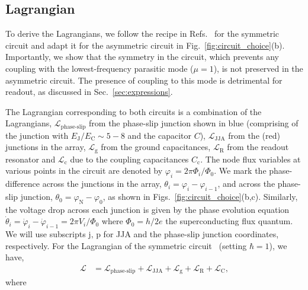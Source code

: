 \documentclass[%
reprint,
superscriptaddress,
 amsmath,amssymb,
 aps,
 prx,
longbibliography,
floatfix,
]{revtex4-2}
\begin{document}
\subsection{Lagrangian}

To derive the Lagrangians, we follow the recipe in Refs.~\cite{viola2015collective,ferguson2013symmetries} for the symmetric circuit and adapt it for the asymmetric circuit in Fig.~\ref{fig:circuit_choice}(b). Importantly, we show that the symmetry in the circuit, which prevents any coupling with the lowest-frequency parasitic mode ($\mu=1$), is not preserved in the asymmetric circuit. The presence of coupling to this mode is detrimental for readout, as discussed in Sec.~\ref{sec:expressions}.

The Lagrangian corresponding to both circuits is a combination of the Lagrangians, $\mathcal{L}_\textrm{phase-slip}$ from the phase-slip junction shown in blue (comprising of the junction with $E_{\textrm{J}}/E_{\textrm{C}}\sim 5-8$ and the capacitor $C$), $\mathcal{L}_\textrm{JJA}$ from the (red) junctions in the array, $\mathcal{L}_\textrm{g}$ from the ground capacitances, $\mathcal{L}_\textrm{R}$ from the readout resonator and $\mathcal{L}_\textrm{c}$ due to the coupling capacitances $C_\textrm{c}$. The node flux variables at various points in the circuit are denoted by $\varphi_i=2\pi\Phi_i/\Phi_0$. We mark the phase-difference across the junctions in the array, $\theta_{i}=\varphi_i-\varphi_{i-1}$, and across the phase-slip junction, $\theta_0=\varphi_\textrm{N}-\varphi_{0}$, as shown in Figs.~\ref{fig:circuit_choice}(b,c). Similarly, the voltage drop across each junction is given by the phase evolution equation $\dot{\theta}_i=\dot{\varphi}_i-\dot{\varphi}_{i-1}=2\pi V_i/\Phi_0$ where $\Phi_0=h/2e$ the superconducting flux quantum. We will use subscripts $\textrm{j, p}$ for JJA and the phase-slip junction coordinates, respectively. For the Lagrangian of the symmetric circuit~\cite{viola2015collective,ferguson2013symmetries} (setting $\hbar=1$), we have, 
\begin{align}
    \mathcal{L}&=\mathcal{L}_{\textrm{phase-slip}}+\mathcal{L}_{\textrm{JJA}}+\mathcal{L}_{\textrm{g}}+\mathcal{L}_{\textrm{R}}+\mathcal{L}_{\textrm{C}},
\end{align}
where
\end{document}
